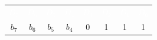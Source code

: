 \begin{tabular}{cccccccc}\rowcolor{DEplava}\textcolor{white}{$D_7$}&\textcolor{white}{$D_6$}&\textcolor{white}{$D_5$}&\textcolor{white}{$D_4$}&\textcolor{white}{$D_3$}&\textcolor{white}{$D_2$}&\textcolor{white}{$D_1$}&\textcolor{white}{$D_0$}\\\rowcolor{DEplava!12}$b_7$&$b_6$&$b_5$&$b_4$&\textcolor{DEcrvena}{0}&\textcolor{DEcrvena}{1}&\textcolor{DEcrvena}{1}&\textcolor{DEcrvena}{1}\end{tabular}